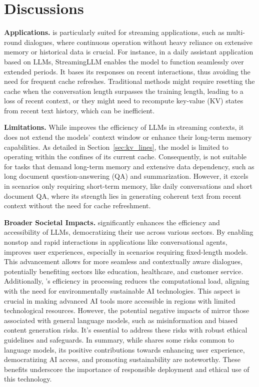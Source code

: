 \appendix
\section{Discussions}
\textbf{Applications.}
\method is particularly suited for streaming applications, such as multi-round dialogues, where continuous operation without heavy reliance on extensive memory or historical data is crucial. For instance, in a daily assistant application based on LLMs, StreamingLLM enables the model to function seamlessly over extended periods. It bases its responses on recent interactions, thus avoiding the need for frequent cache refreshes. Traditional methods might require resetting the cache when the conversation length surpasses the training length, leading to a loss of recent context, or they might need to recompute key-value (KV) states from recent text history, which can be inefficient.

\textbf{Limitations.}
While \method improves the efficiency of LLMs in streaming contexts, it does not extend the models' context window or enhance their long-term memory capabilities. As detailed in Section~\ref{sec:kv_lines}, the model is limited to operating within the confines of its current cache. Consequently, \method is not suitable for tasks that demand long-term memory and extensive data dependency, such as long document question-answering (QA) and summarization. However, it excels in scenarios only requiring short-term memory, like daily conversations and short document QA, where its strength lies in generating coherent text from recent context without the need for cache refreshment.

\textbf{Broader Societal Impacts.}
\method significantly enhances the efficiency and accessibility of LLMs, democratizing their use across various sectors. By enabling nonstop and rapid interactions in applications like conversational agents, \method improves user experiences, especially in scenarios requiring fixed-length models. This advancement allows for more seamless and contextually aware dialogues, potentially benefiting sectors like education, healthcare, and customer service.
Additionally, \method's efficiency in processing reduces the computational load, aligning with the need for environmentally sustainable AI technologies. This aspect is crucial in making advanced AI tools more accessible in regions with limited technological resources.
However, the potential negative impacts of \method mirror those associated with general language models, such as misinformation and biased content generation risks. It's essential to address these risks with robust ethical guidelines and safeguards.
In summary, while \method shares some risks common to language models, its positive contributions towards enhancing user experience, democratizing AI access, and promoting sustainability are noteworthy. These benefits underscore the importance of responsible deployment and ethical use of this technology.


